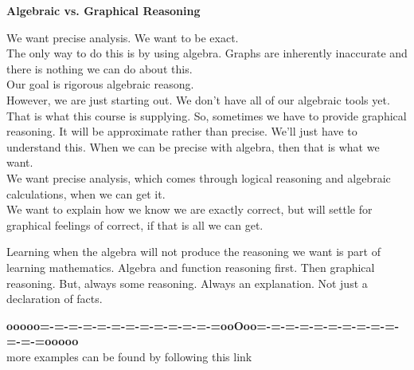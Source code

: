 \documentclass{ximera}
\begin{document}
\begin{warning}  \textbf{\textcolor{blue!55!black}{Algebraic vs. Graphical Reasoning}}


We want precise analysis.  We want to be exact. \\


The only way to do this is by using algebra.  Graphs are inherently inaccurate and there is nothing we can do about this. \\


Our goal is rigorous algebraic reasong. \\



However, we are just starting out.  We don't have all of our algebraic tools yet.  That is what this course is supplying.  So, sometimes we have to provide graphical reasoning.  It will be approximate rather than precise.  We'll just have to understand this.  When we can be precise with algebra, then that is what we want. \\


We want precise analysis, which comes through logical reasoning and algebraic calculations, when we can get it. \\


We want to explain how we know we are exactly correct, but will settle for graphical feelings of correct, if that is all we can get. \\


\end{warning}



Learning when the algebra will not produce the reasoning we want is part of learning mathematics.  Algebra and function reasoning first. Then graphical reasoning.  But, always some reasoning.  Always an explanation. Not just a declaration of facts.








\begin{center}
\textbf{\textcolor{green!50!black}{ooooo=-=-=-=-=-=-=-=-=-=-=-=-=ooOoo=-=-=-=-=-=-=-=-=-=-=-=-=ooooo}} \\

more examples can be found by following this link\\ 

\end{center}
\end{document}
